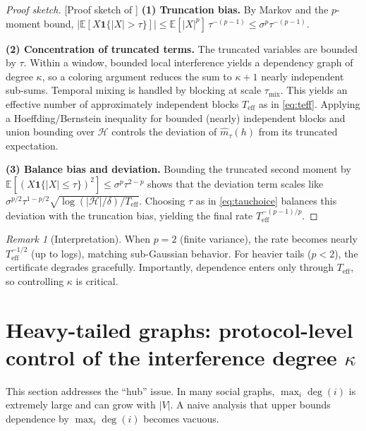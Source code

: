 \documentclass[11pt]{article}
\newcommand{\E}{\mathbb{E}}
\newcommand{\1}{\mathbf{1}}
\newcommand{\cH}{\mathcal{H}}
\newcommand{\abs}[1]{\left|#1\right|}
\theoremstyle{plain}
\theoremstyle{definition}
\theoremstyle{remark}
\newtheorem{remark}[theorem]{Remark}
\newenvironment{proofsketch}{\begin{proof}[Proof sketch]}{\end{proof}}
\begin{document}
\begin{proofsketch}[Proof sketch of ]
\textbf{(1) Truncation bias.}
By Markov and the $p$-moment bound,
$\abs{\E[X\1\{\abs{X}>\tau\}]}\le \E[\abs{X}^p]\,\tau^{-(p-1)}\le \sigma^p\tau^{-(p-1)}$.

\textbf{(2) Concentration of truncated terms.}
The truncated variables are bounded by $\tau$.
Within a window, bounded local interference yields a dependency graph of degree $\kappa$,
so a coloring argument reduces the sum to $\kappa+1$ nearly independent sub-sums.
Temporal mixing is handled by blocking at scale $\tau_{\mathrm{mix}}$.
This yields an effective number of approximately independent blocks $T_{\mathrm{eff}}$ as in \eqref{eq:teff}.
Applying a Hoeffding/Bernstein inequality for bounded (nearly) independent blocks and union bounding over $\cH$
controls the deviation of $\widehat m_{\tau}(h)$ from its truncated expectation.

\textbf{(3) Balance bias and deviation.}
Bounding the truncated second moment by $\E[(X\1\{\abs{X}\le \tau\})^2]\le \sigma^p\tau^{2-p}$
shows that the deviation term scales like
$\sigma^{p/2}\tau^{1-p/2}\sqrt{\log(\abs{\cH}/\delta)/T_{\mathrm{eff}}}$.
Choosing $\tau$ as in \eqref{eq:tauchoice} balances this deviation with the truncation bias,
yielding the final rate $T_{\mathrm{eff}}^{-(p-1)/p}$.
\end{proofsketch}

\begin{remark}[Interpretation]
When $p=2$ (finite variance), the rate becomes nearly $T_{\mathrm{eff}}^{-1/2}$ (up to logs),
matching sub-Gaussian behavior.
For heavier tails ($p<2$), the certificate degrades gracefully.
Importantly, dependence enters only through $T_{\mathrm{eff}}$, so controlling $\kappa$ is critical.
\end{remark}

\section{Heavy-tailed graphs: protocol-level control of the interference degree $\kappa$}
\label{sec:kappa}

This section addresses the ``hub'' issue.
In many social graphs, $\max_i \deg(i)$ is extremely large and can grow with $|V|$.
A naive analysis that upper bounds dependence by $\max_i\deg(i)$ becomes vacuous.
\end{document}
